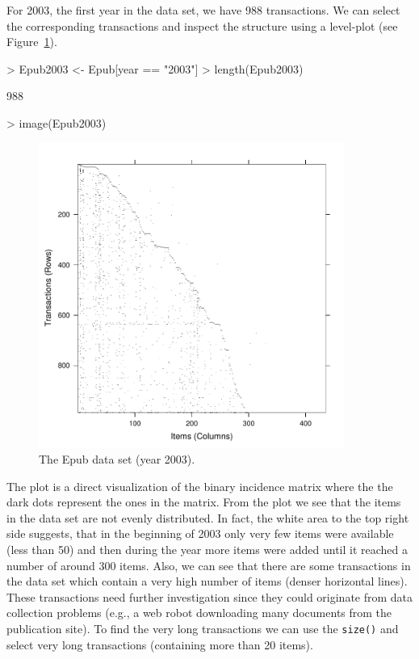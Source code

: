 \documentclass[10pt,a4paper]{article}
\newcommand{\func}[1]{\mbox{\texttt{#1()}}}
\begin{document}
For 2003, the first year in the data set, we have 988
transactions.  We can select the corresponding transactions and inspect
the structure using a level-plot (see Figure~\ref{fig:imageEpub}).

\begin{Schunk}
\begin{Sinput}
> Epub2003 <- Epub[year == "2003"]
> length(Epub2003)
\end{Sinput}
\begin{Soutput}
[1] 988
\end{Soutput}
\begin{Sinput}
> image(Epub2003)
\end{Sinput}
\end{Schunk}
\begin{figure}
\centering
\includegraphics[width=10cm]{arules-epub}
\caption{The Epub data set (year 2003).}
\label{fig:imageEpub}
\end{figure}

The plot is a direct visualization of the binary incidence matrix where
the the dark dots represent the ones in the matrix.  From the plot we
see that the items in the data set are not evenly distributed.  In fact,
the white area to the top right side suggests, that in the beginning of
2003 only very few items were available (less than 50) and then during
the year more items were added until it reached a number of around 300
items. Also, we can see that there are some transactions in the data set
which contain a very high number of items (denser horizontal lines).
These transactions need further investigation since they could originate
from data collection problems (e.g., a web robot downloading many
documents from the publication site).  To find the very long
transactions we can use the \func{size} and select very long
transactions (containing more than 20 items).
\end{document}

